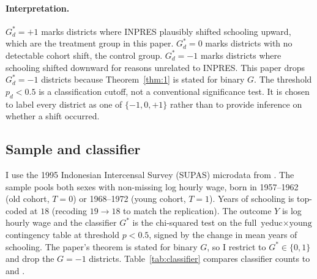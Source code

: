 \paragraph{Interpretation.} $G^*_d = +1$ marks districts where INPRES plausibly shifted schooling upward, which are the treatment group in this paper. $G^*_d = 0$ marks districts with no detectable cohort shift, the control group. $G^*_d = -1$ marks districts where schooling shifted downward for reasons unrelated to INPRES. This paper drops $G^*_d = -1$ districts because Theorem~\ref{thm:1} is stated for binary $G$. The threshold $p_d < 0.5$ is a classification cutoff, not a conventional significance test. It is chosen to label every district as one of $\{-1, 0, +1\}$ rather than to provide inference on whether a shift occurred.

\subsection{Sample and classifier}\label{sec:app_sample}

I use the 1995 Indonesian Intercensal Survey (SUPAS) microdata from \citet{duflo2001schooling}. The sample pools both sexes with non-missing log hourly wage, born in 1957--1962 (old cohort, $T=0$) or 1968--1972 (young cohort, $T=1$). Years of schooling is top-coded at $18$ (recoding $19 \to 18$ to match the \citeauthor{fuzzy2018} replication). The outcome $Y$ is log hourly wage and the classifier $G^*$ is the chi-squared test on the full $\text{yeduc} \times \text{young}$ contingency table at threshold $p < 0.5$, signed by the change in mean years of schooling. The paper's theorem is stated for binary $G$, so I restrict to $G^* \in \{0, 1\}$ and drop the $G = -1$ districts. Table~\ref{tab:classifier} compares classifier counts to \cite{duflo2001schooling} and \cite{fuzzy2018}.

\begin{table}[H]
    \centering
    \small
    
    \caption[District classifier comparison]{District classifier comparison. \cite{duflo2001schooling} uses continuous INPRES intensity as an instrument and has no binary $G^*$. \cite{fuzzy2018} Table~3 reports counts $97/64/123$; ours are $96/67/127$, within $\pm 4$ districts due to boundary drift between R's \texttt{chisq.test} and Stata's \texttt{tab2, chi2}. \citeauthor{fuzzy2018} pool $G^* \in \{-1, 0, +1\}$ via a mirror Wald formula and report on the full 284-district sample. This paper's theorem handles binary $G$, so I restrict to $G^* \in \{0, 1\}$, which gives $N = 22{,}414$ observations in $201$ districts.}\label{tab:classifier}
\end{table}


